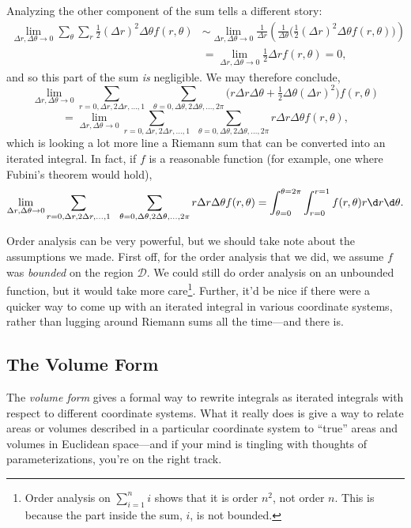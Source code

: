 Analyzing the other component of the sum tells a different story:
\begin{align*}
	\lim_{\Delta r,\Delta\theta\to 0}
	\sum_{\theta}\sum_{r} \tfrac{1}{2}(\Delta r)^2\Delta \theta f(r,\theta)
	&\sim
	\lim_{\Delta r,\Delta\theta\to 0}
	\frac{1}{\Delta r}\left(\frac{1}{\Delta \theta} \Big(\tfrac{1}{2}(\Delta r)^2\Delta\theta f(r,\theta)\Big)\right)\\
	&=\lim_{\Delta r,\Delta\theta \to 0}\tfrac{1}{2}\Delta rf(r,\theta) = 0,
\end{align*}
and so this part of the sum \emph{is} negligible.  We may therefore conclude,
\[
	\lim_{\Delta r,\Delta \theta\to 0}
	\sum_{r=0,\Delta r,2\Delta r,\ldots,1}\ \ \sum_{\theta=0,\Delta\theta,
	2\Delta\theta, \ldots, 2\pi} \Big(
		r\Delta r\Delta \theta + \tfrac{1}{2}\Delta\theta(\Delta r)^2
	\Big)f(r,\theta)
\]
\[
	=\lim_{\Delta r,\Delta \theta\to 0}
	\sum_{r=0,\Delta r,2\Delta r,\ldots,1}\ \ \sum_{\theta=0,\Delta\theta,
	2\Delta\theta, \ldots, 2\pi} 
		r\Delta r\Delta \theta f(r,\theta),
\]
which is looking a lot more line a Riemann sum that can be converted into an iterated integral.
In fact, if $f$ is a reasonable function (for example, one where Fubini's theorem would hold),
\[
	\lim_{\Delta r,\Delta \theta\to 0}
	\sum_{r=0,\Delta r,2\Delta r,\ldots,1}\ \ \sum_{\theta=0,\Delta\theta,
	2\Delta\theta, \ldots, 2\pi} 
		r\Delta r\Delta \theta f(r,\theta)
		=\int_{\theta=0}^{\theta=2\pi}\int_{r=0}^{r=1}f(r,\theta)r\d r\d \theta.
\]

Order analysis can be very powerful, but we should take note about the assumptions we made.
First off, for the order analysis that we did, we assume $f$ was \emph{bounded} on the region
$\mathcal D$.  We could still do order analysis on an unbounded function, but it would take more 
care\footnote{
	Order analysis on $\sum_{i=1}^n i$ shows that it is order $n^2$, not order $n$.
	This is because the part inside the sum, $i$, is not bounded.
}.  Further, it'd be nice if there were a quicker way to come up with an iterated
integral in various coordinate systems, rather than lugging around Riemann sums
all the time---and there is.

\subsection{The Volume Form}

The \emph{volume form} gives a formal way to rewrite integrals as iterated integrals
with respect to different coordinate systems.  What it really does is give a way
to relate areas or volumes described in a particular coordinate system to ``true''
areas and volumes in Euclidean space---and if your mind is tingling with thoughts
of parameterizations, you're on the right track.


